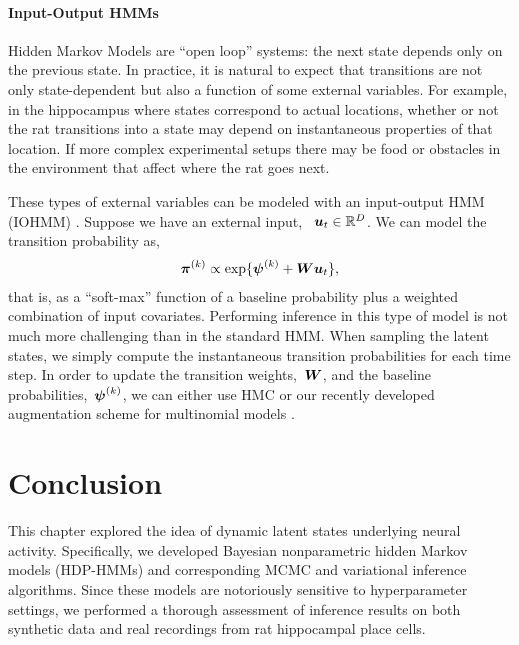 \paragraph{Input-Output HMMs}
Hidden Markov Models are ``open loop'' systems: the next state 
depends only on the previous state.  In practice, it is natural to 
expect that transitions are not only state-dependent but also a 
function of some external variables. For example, in the hippocampus 
where states correspond to actual locations, whether or not the 
rat transitions into a state may depend on instantaneous properties 
of that location. If more complex experimental setups there may 
be food or obstacles in the environment that affect where the rat 
goes next. 

These types of external variables can be modeled with an input-output 
HMM (IOHMM) \cite{bengio1995input}. Suppose we have an external input,
~$\boldsymbol{u}_t \in \mathbb{R}^D$. We can model the transition probability as,
\begin{align*}
\boldsymbol{\pi}^{(k)} &\propto \exp\{\boldsymbol{\psi}^{(k)} + \boldsymbol{W} \boldsymbol{u}_t\}, \\
\end{align*}
that is, as a ``soft-max'' function of a baseline probability plus a 
weighted combination of input covariates.  Performing inference in this 
type of model is not much more challenging than in the standard HMM.
When sampling the latent states, we simply compute the instantaneous
transition probabilities for each time step. In order to update the 
transition weights,~$\boldsymbol{W}$, and the baseline probabilities,~$\boldsymbol{\psi}^{(k)}$,
we can either use HMC or our recently developed \polyagamma augmentation scheme for multinomial
models \cite{linderman2015dependent}.


\section{Conclusion}
This chapter explored the idea of dynamic latent states underlying 
neural activity. Specifically, we developed Bayesian nonparametric 
hidden Markov models (HDP-HMMs) and corresponding MCMC and variational 
inference algorithms. Since these models are notoriously sensitive 
to hyperparameter settings, we performed a thorough assessment of 
inference results on both synthetic data and real recordings from 
rat hippocampal place cells. 

